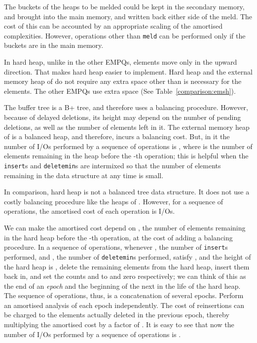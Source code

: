 The buckets of the heaps to be melded could be kept in the secondary memory, 
and brought into the main memory, and written back either side of the meld. 
The cost of this can be accounted
by an appropriate scaling of the amortised complexities.
However, operations other than {\tt meld} can be performed only if the buckets are 
in the main memory.
 
In hard heap, unlike in the other EMPQs, 
elements move only in the upward direction. 
That makes hard heap easier to implement.
Hard heap and the external memory heap of \cite{FJKT99} do not require any extra space
other than is necessary for the elements.
The other EMPQs \cite{Arge03,KS96} use extra space (See Table~\ref{comparison:emsh}).
  
The buffer tree \cite{Arge03} is a B+ tree, and therefore uses a balancing procedure.
However, because of delayed deletions, its height may depend on the number of pending
deletions, as well as the number of elements left in it.
The external memory heap of \cite{FJKT99} is a balanced heap, and therefore,
incurs a balancing cost. But, in it the number of
I/Os performed by a sequence of  operations is
, where  is the number
of elements remaining in the heap before the -th operation; this is helpful
when the {\tt insert}s and {\tt deletemin}s are intermixed so that the number
of elements remaining in the data structure at any time is small.  

In comparison, hard heap is not a balanced tree data structure. It does not use a costly
balancing procedure like the heaps of \cite{FJKT99,KS96}.
However, for a sequence of  operations, 
	the amortised cost of each operation is  I/Os.

We can make the amortised cost depend on , the number
of elements remaining in the hard heap before the -th operation, at the cost
of adding a balancing procedure.
In a sequence of operations, whenever , the number of {\tt insert}s performed, and , 
	the number of {\tt deletemin}s performed, satisfy ,
	and the height of the hard heap is , 
	delete the remaining  elements from the hard heap,  insert them back in,
	and set the counts  and  to  and zero respectively;
	we can think of this as the end of an {\em epoch} and the beginning of the next in
	the life of the hard heap. 
The sequence of operations, thus, is a concatenation of several epochs.
Perform an amortised analysis of each epoch independently. 
The cost of reinsertions can be charged to the elements actually deleted in the previous
	epoch, thereby multiplying the amortised cost
	by a factor of .
It is easy to see that now the number of
I/Os performed by a sequence of  operations is
.


